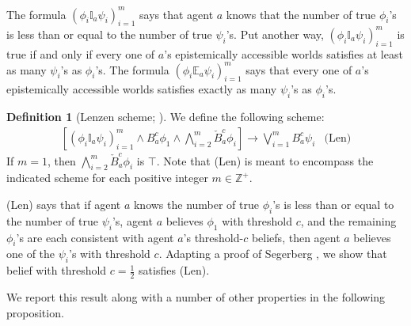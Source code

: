\documentclass[12pt]{article}
\theoremstyle{definition}
\newtheorem{definition}[theorem]{Definition}
\newcommand{\Int}{\mathbb{Z}}  %
\begin{document}
The formula $(\phi_i\mathbb{I}_a\psi_i)_{i=1}^m$ says that agent
$a$ knows that the number of true $\phi_i$'s is less than or equal to the number of
true $\psi_i$'s.  Put another way,
$(\phi_i\mathbb{I}_a\psi_i)_{i=1}^m$ is true if and only if every
one of $a$'s epistemically accessible worlds satisfies at least as many
$\psi_i$'s as $\phi_i$'s.  The formula $(\phi_i\mathbb{E}_a\psi_i)_{i=1}^m$ says
that every
one of $a$'s epistemically accessible worlds satisfies exactly as many
$\psi_i$'s as $\phi_i$'s.

\begin{definition}[Lenzen scheme; \cite{Lenzen2003:kbasp}]
  \label{definition:lenzen-schemes}
  We define the following scheme:
  \[
  \begin{array}{cl}
    \textstyle [
    (\phi_i\mathbb{I}_a\psi_i)_{i=1}^m
    \land B_a^{c} \phi_1 \land \bigwedge_{i=2}^m \check B_a^{c} \phi_i] \to
    \bigvee_{i=1}^m B_a^{c}\psi_i
    &
    \text{(Len)}
  \end{array}
  \]
  If $m=1$, then $\bigwedge_{i=2}^m \check B_a^c\phi_i$ is $\top$.
  Note that (Len)
  is meant to encompass the indicated scheme for each positive integer
  $m\in\Int^+$.
\end{definition}

(Len) says that if agent $a$ knows the number of true $\phi_i$'s is
less than or equal to the number of true $\psi_i$'s, agent $a$ believes $\phi_1$
with threshold $c$, and the remaining $\phi_i$'s are each consistent
with agent $a$'s threshold-$c$ beliefs, then agent $a$ believes one of
the $\psi_i$'s with threshold $c$.  Adapting a proof of Segerberg
\cite{Segerberg1971:qpiams}, we show that belief with threshold
$c=\frac12$ satisfies (Len).

We report this result along with a number of other properties
in the following proposition.
\end{document}
